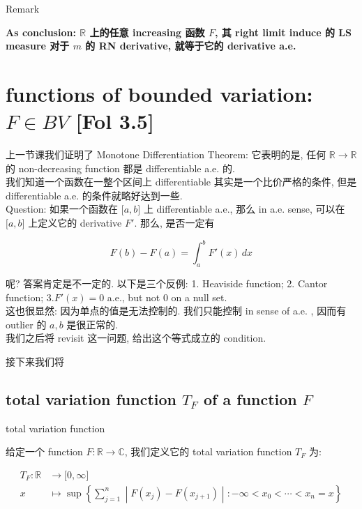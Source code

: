 \documentclass{qlnotes-export}
\begin{document}
\begin{qlremark}{Remark}

\textbf{As conclusion: \(\mathbb{R}\) 上的任意 increasing 函数 \(F\), 其 right limit induce 的 LS measure 对于 \(m\) 的 RN derivative, 就等于它的 derivative a.e.}

\end{qlremark}

\section{\texorpdfstring{functions of bounded variation: \(F \in BV\) {[}Fol 3.5{]}}{functions of bounded variation: F \textbackslash in BV {[}Fol 3.5{]}}}

上一节课我们证明了 Monotone Differentiation Theorem: 它表明的是, 任何 \({\mathbb{R}}\rightarrow{\mathbb{R}}\) 的 non-decreasing function 都是 differentiable a.e. 的.\\
我们知道一个函数在一整个区间上 differentiable 其实是一个比价严格的条件, 但是 differentiable a.e. 的条件就略好达到一些.\\
Question: 如果一个函数在 \(\lbrack a,b\rbrack\) 上 differentiable a.e., 那么 in a.e. sense, 可以在 \(\lbrack a,b\rbrack\) 上定义它的 derivative \(F'\). 那么, 是否一定有

\[F(b) - F(a) = \int_{a}^{b}F'(x)\, dx\]

呢? 答案肯定是不一定的. 以下是三个反例: 1. Heaviside function; 2. Cantor function; 3.\(F'(x) = 0\) a.e., but not \(0\) on a null set.\\
这也很显然: 因为单点的值是无法控制的. 我们只能控制 in sense of a.e. , 因而有 outlier 的 \(a,b\) 是很正常的.\\
我们之后将 revisit 这一问题, 给出这个等式成立的 condition.

接下来我们将

\subsection{\texorpdfstring{total variation function \(T_{F}\) of a function \(F\)}{total variation function T\_\{F\} of a function F}}\label{total-variation-function-t_f-of-a-function-f}

\begin{definition}{total variation function}\label{def-12-differentiation-on-real-spaces-total-variation-function}

给定一个 function \(F:{\mathbb{R}}\rightarrow{\mathbb{C}}\), 我们定义它的 total variation function \(T_{F}\) 为:

\[\begin{matrix}
{T_{F}:{\mathbb{R}}} & {\rightarrow\lbrack 0,\infty\rbrack} \\
x & {\mapsto\sup\left\{ \sum\limits_{j = 1}^{n} \middle| F(x_{j}) - F(x_{j + 1}) \middle| : - \infty < x_{0} < \cdots < x_{n} = x \right\}}
\end{matrix}\]

\end{definition}
\end{document}
